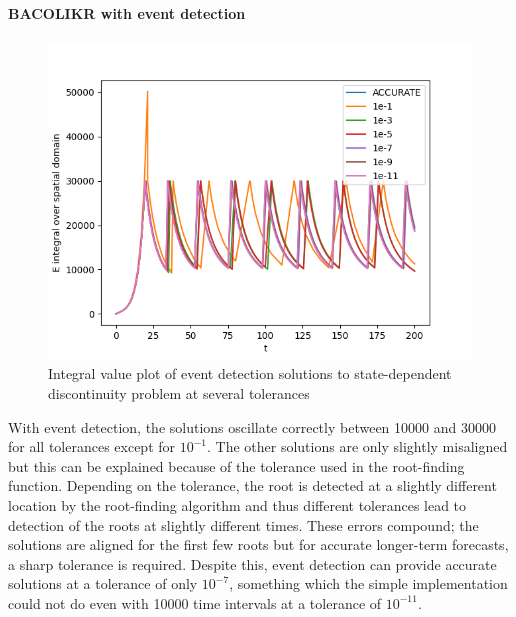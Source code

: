 \paragraph{BACOLIKR with event detection}
\begin{figure}[H]
\centering
\includegraphics[width=0.7\linewidth]{./figures/pde_state_disc_tol_event}
\caption{Integral value plot of event detection solutions to state-dependent discontinuity problem at several tolerances}
\label{fig:pde_state_disc_tol_event}
\end{figure}

With event detection, the solutions oscillate correctly between 10000 and 30000 for all tolerances except for $10^{-1}$. The other solutions are only slightly misaligned but this can be explained because of the tolerance used in the root-finding function. Depending on the tolerance, the root is detected at a slightly different location by the root-finding algorithm and thus different tolerances lead to detection of the roots at slightly different times. These errors compound; the solutions are aligned for the first few roots but for accurate longer-term forecasts, a sharp tolerance is required. Despite this, event detection can provide accurate solutions at a tolerance of only $10^{-7}$, something which the simple implementation could not do even with 10000 time intervals at a tolerance of $10^{-11}$.

